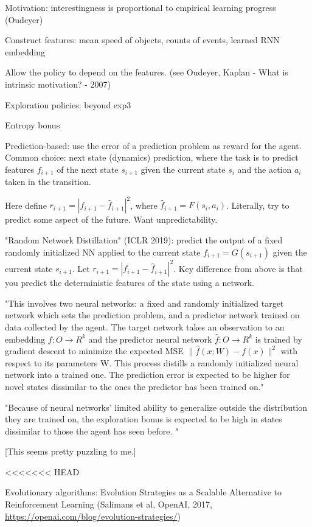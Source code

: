 \documentclass[english]{article}
\begin{document}
Motivation: interestingness is proportional to empirical learning progress (Oudeyer)

Construct features: mean speed of objects, counts of events, learned RNN embedding

Allow the policy to depend on the features. (see Oudeyer, Kaplan - What is intrinsic motivation?  - 2007)

\item Exploration policies: beyond exp3

Entropy bonus

Prediction-based: use the error of a prediction problem as reward for the agent. Common choice: next state (dynamics) prediction, where the task is to predict features $f_{i+1}$ of the next state $s_{i+1}$ given the current state $s_i$ and the action $a_i$ taken in the transition. 

Here define $r_{i+1} = |f_{i+1}-\hat f_{i+1}|^2$, where $\hat f_{i+1} = F(s_{i},a_i)$. Literally, try to predict some aspect of the future. Want unpredictability.


"Random Network Distillation" (ICLR 2019): predict the output of a fixed randomly initialized NN applied to the current state $f_{i+1} = G(s_{i+1})$ given the current state $s_{i+1}$. Let $r_{i+1} = |f_{i+1}-\hat f_{i+1}|^2$. Key difference from above is that you predict the deterministic features of the state using a network. 

"This involves two neural networks: a fixed and randomly initialized target network which sets the
prediction problem, and a predictor network trained on data collected by the agent. The target network
takes an observation to an embedding $f : O \to R^k$ and the predictor neural network $\hat f : O \to R^k$
is trained by gradient descent to minimize the expected MSE $\|\hat f(x;W) − f(x)\|^2$ with respect to its
parameters W. This process distills a randomly initialized neural network into a trained one. The
prediction error is expected to be higher for novel states dissimilar to the ones the predictor has been
trained on."

"Because of neural networks' limited ability to generalize outside the distribution they are trained on, the exploration bonus is expected to be high in states dissimilar to those the agent has seen before. "


[This seems pretty puzzling to me.]

<<<<<<< HEAD
\item Evolutionary algorithms: Evolution Strategies as a Scalable Alternative to Reinforcement Learning (Salimans et al, OpenAI, 2017, \url{https://openai.com/blog/evolution-strategies/})
\end{document}
